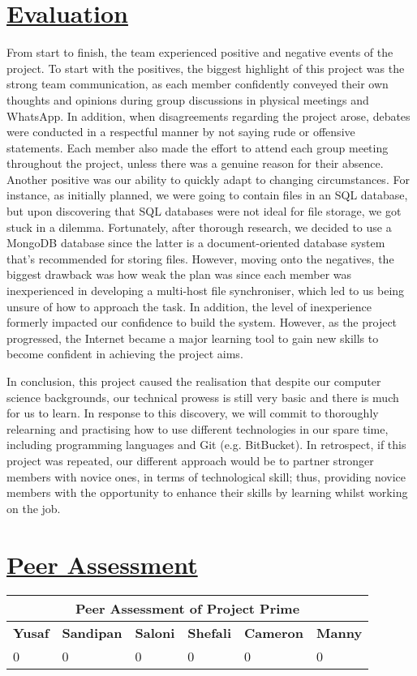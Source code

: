 \documentclass{article}
\begin{document}
\section{\underline{Evaluation}}
From start to finish, the team experienced  positive and negative events of the project. To start with the positives, the biggest highlight of this project was the strong team communication, as each member confidently conveyed their own thoughts and opinions during group discussions in physical meetings and WhatsApp. In addition, when disagreements regarding the project arose, debates were conducted in a respectful manner by not saying rude or offensive statements. Each member also made the effort to attend each group meeting throughout the project, unless there was a genuine reason for their absence. Another positive was our ability to quickly adapt to changing circumstances. For instance, as initially planned, we were going to contain files in an SQL database, but upon discovering that SQL databases were not ideal for file storage, we got stuck in a dilemma. Fortunately, after thorough research, we decided to use a MongoDB database since the latter is a document-oriented database system that's recommended for storing files. However, moving onto the negatives, the biggest drawback was how weak the plan was since each member was inexperienced in developing a multi-host file synchroniser, which led to us being unsure of how to approach the task. In addition, the level of inexperience formerly impacted our confidence to build the system. However, as the project progressed, the Internet became a major learning tool to gain new skills to become confident in achieving the project aims.

In conclusion, this project caused the realisation that despite our computer science backgrounds, our technical prowess is still very basic and there is much for us to learn. In response to this discovery, we will commit to thoroughly relearning and practising how to use different technologies in our spare time, including programming languages and Git (e.g. BitBucket). In retrospect, if this project was repeated, our different approach would be to partner stronger members with novice ones, in terms of technological skill; thus, providing novice members with the opportunity to enhance their skills by learning whilst working on the job.   

\section{\underline{Peer Assessment}}
\begin{tabular}{|p{2cm}|p{2cm}|p{2cm}|p{2cm}|p{2cm}|p{2cm}|}
\hline
\multicolumn{6}{|c|}{\textbf{Peer Assessment of Project Prime}} \\
\hline
\textbf{Yusaf} & \textbf{Sandipan} & \textbf{Saloni} & \textbf{Shefali} & \textbf{Cameron} & \textbf{Manny} \\
\hline
0 & 0 & 0 & 0 & 0 & 0 \\
\hline
\end{tabular}
	
\end{document}
